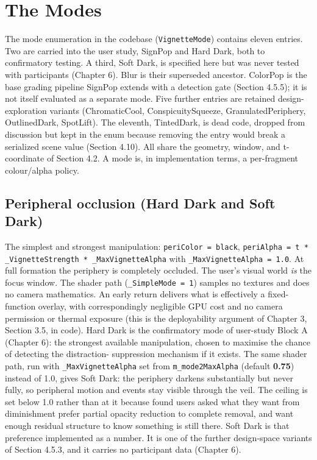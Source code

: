
\section{The Modes}

The mode enumeration in the codebase (\verb|VignetteMode|) contains eleven entries. Two are carried
into the user study, SignPop and Hard Dark, both to confirmatory testing. A third, Soft Dark, is
specified here but was never tested with participants (Chapter 6). Blur is their superseded ancestor. ColorPop is the base grading pipeline SignPop extends
with a detection gate (Section 4.5.5); it is not itself evaluated as a separate mode. Five further
entries are retained design-exploration variants (ChromaticCool, ConspicuitySqueeze,
GranulatedPeriphery, OutlinedDark, SpotLift). The eleventh, TintedDark, is dead code, dropped from
discussion but kept in the enum because removing the entry would break a serialized scene value
(Section 4.10). All share the geometry, window, and t-coordinate of Section 4.2. A mode is, in
implementation terms, a per-fragment colour/alpha policy.

\subsection{Peripheral occlusion (Hard Dark and Soft Dark)}

The simplest and strongest manipulation: \verb|periColor = black|,
\verb|periAlpha = t * _VignetteStrength * _MaxVignetteAlpha| with \verb|_MaxVignetteAlpha = 1.0|. At full
formation the periphery is completely occluded. The user's visual world \textit{is} the focus window. The
shader path (\verb|_SimpleMode = 1|) samples no textures and does no camera mathematics. An early return
delivers what is effectively a fixed-function overlay, with correspondingly negligible GPU cost and
no camera permission or thermal exposure (this is the deployability argument of Chapter 3,
Section 3.5, in code). Hard Dark is the confirmatory mode of user-study Block A (Chapter 6): the
strongest available manipulation, chosen to maximise the chance of detecting the distraction-
suppression mechanism if it exists. The same shader path, run with \verb|_MaxVignetteAlpha| set from
\verb|m_mode2MaxAlpha| (default \textbf{0.75}) instead of 1.0, gives Soft Dark: the periphery darkens
substantially but never fully, so peripheral motion and events stay visible through the veil. The
ceiling is set below 1.0 rather than at it because \citet{cheng2022} found users asked what they
want from diminishment prefer partial opacity reduction to complete removal, and want enough residual
structure to know something is still there. Soft Dark is that preference implemented as a number. It
is one of the further design-space variants of Section 4.5.3, and it carries no participant data
(Chapter 6).

